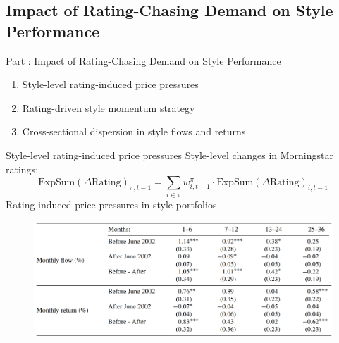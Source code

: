 \documentclass[UTF8, 16pt]{beamer}
\begin{document}
\begin{CJK*}{UTF8}{gbsn}
\subsection{Impact of Rating-Chasing Demand on Style Performance}

\begin{frame}{Part \uppercase\expandafter{}: Impact of Rating-Chasing Demand on Style Performance}
	 \begin{enumerate}
	 	\item \alert{Style-level} rating-induced price pressures
	 	\item Rating-driven \alert{style} momentum strategy
	 	\item Cross-sectional dispersion in \alert{style} flows and returns
	 \end{enumerate}
\end{frame}

\begin{frame}{Style-level rating-induced price pressures}
	Style-level changes in Morningstar ratings:
	$$
	\mathrm{ExpSum}(\Delta \mathrm{Rating})_{\pi, t-1}=\sum_{ {i\in\pi}}{w_{i, t-1}^{\pi}} \cdot \mathrm{ExpSum}(\Delta \mathrm{Rating})_{i, t-1}
	$$
	\center \tiny{Rating-induced price pressures in style portfolios}
	\vspace{-0.3cm}
	\begin{figure}[htpb]
	  \begin{center}
	    \includegraphics[width=1  \linewidth]
	    {pic/style_portfolios.png}
	  \end{center}
	\end{figure}
\end{frame}


\end{CJK*}
\end{document}
